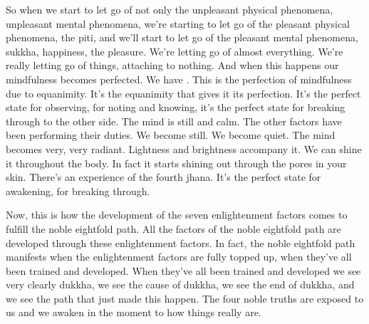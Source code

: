 \documentclass[letterpaper,10pt,english]{sphinxmanual}
\begin{document}
\sphinxAtStartPar
So when we start to let go of not only the unpleasant physical phenomena,   unpleasant mental phenomena, we’re starting to let go of the pleasant
physical phenomena, the piti, and we’ll start to let go of the pleasant mental
phenomena,  sukkha,  happiness,  the  pleasure.  We’re  letting  go  of  almost
everything. We’re really letting go of things, attaching to nothing. And when
this happens our mindfulness becomes perfected. We have
. This
is the perfection of mindfulness due to equanimity. It’s the equanimity that
gives  it  its  perfection.  It’s  the  perfect  state  for  observing,  for  noting  and
knowing,  it’s  the  perfect  state  for  breaking  through  to  the  other  side. The
mind is still and calm. The other factors have been performing their duties.
We become still. We become quiet. The mind becomes very, very radiant.
Lightness and brightness accompany it. We can shine it throughout the body.
In fact it starts shining out through the pores in your skin. There’s an experience of the fourth jhana. It’s the perfect state for awakening, for breaking
through.

\sphinxAtStartPar
Now, this is how the development of the seven enlightenment factors
comes to fulfill the noble eightfold path. All the factors of the noble eightfold
path are developed through these enlightenment factors. In fact, the noble
eightfold path manifests when the enlightenment factors are fully topped up,
when they’ve all been trained and developed. When they’ve all been trained
and developed we see very clearly dukkha, we see the cause of dukkha, we
see the end of dukkha, and we see the path that just made this happen. The
four noble truths are exposed to us and we awaken in the moment to how
things really are.
\end{document}
